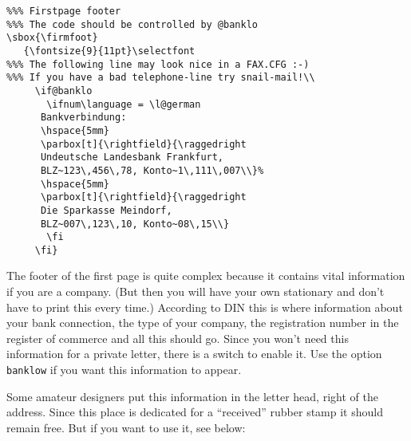 \documentclass[a4paper]{article}
\begin{document}
\begin{verbatim}
%%% Firstpage footer
%%% The code should be controlled by @banklo
\sbox{\firmfoot}
   {\fontsize{9}{11pt}\selectfont
%%% The following line may look nice in a FAX.CFG :-)
%%% If you have a bad telephone-line try snail-mail!\\
     \if@banklo
       \ifnum\language = \l@german
	  Bankverbindung:
	  \hspace{5mm}
	  \parbox[t]{\rightfield}{\raggedright
	  Undeutsche Landesbank Frankfurt,
	  BLZ~123\,456\,78, Konto~1\,111\,007\\}%
	  \hspace{5mm}
	  \parbox[t]{\rightfield}{\raggedright
	  Die Sparkasse Meindorf,
	  BLZ~007\,123\,10, Konto~08\,15\\}
       \fi
     \fi}
\end{verbatim}

The footer of the first page is quite complex because it contains 
vital information if you are a company. (But then you will have your 
own stationary and don't have to print this every time.) According to 
DIN this is where information about your bank connection, the type of 
your company, the registration number in the register of commerce and 
all this should go. Since you won't need this information for a 
private letter, there is a switch to enable it. Use the option 
\texttt{banklow} if you want this information to appear.

Some amateur designers put this information in the letter head, 
right of the address. Since this place is dedicated for a 
``received'' rubber stamp it should remain free. But if you want to 
use it, see below:
\end{document}
